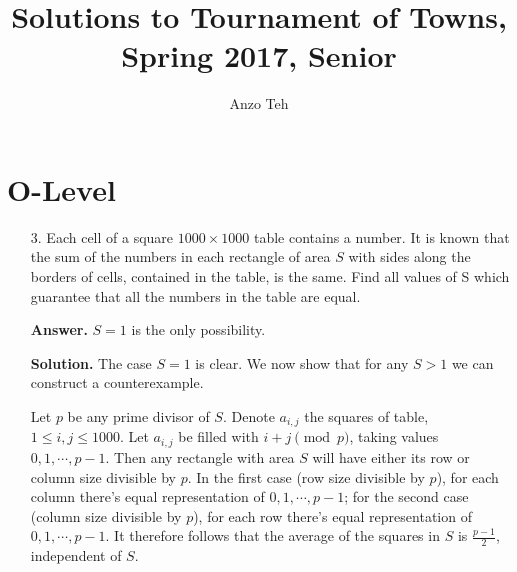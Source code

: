 \documentclass[11pt,a4paper]{article}
\begin{document}
\newcommand{\la}{\leftarrow}
\newcommand{\lra}{\leftrightarrow}
\newcommand{\bbN}{\mathbb{N}}
\newcommand{\bbZ}{\mathbb{Z}}
\newcommand{\dsum}{\displaystyle\sum}
\newcommand{\dprod}{\displaystyle\prod}


\title{Solutions to Tournament of Towns, Spring 2017, Senior}
\author{Anzo Teh}
\date{}
\maketitle

\section*{O-Level}
\begin{enumerate}
	\item[3.]
	Each cell of a square $1000 \times 1000$ table contains a number. It is known
	that the sum of the numbers in each rectangle of area $S$ with sides along
	the borders of cells, contained in the table, is the same. Find all values
	of S which guarantee that all the numbers in the table are equal. 
	
	\textbf{Answer.} $S=1$ is the only possibility. 
	
	\textbf{Solution.} The case $S=1$ is clear. We now show that for any $S>1$ we can construct a counterexample. 
	
	Let $p$ be any prime divisor of $S$. Denote $a_{i, j}$ the squares of table, $1\le i, j\le 1000$. 
	Let $a_{i, j}$ be filled with $i+j\pmod{p}$, taking values $0, 1, \cdots, p-1$. 
	Then any rectangle with area $S$ will have either its row or column size divisible by $p$. 
	In the first case (row size divisible by $p$), for each column there's equal representation of $0, 1, \cdots, p-1$; 
	for the second case (column size divisible by $p$), 
	for each row there's equal representation of $0, 1, \cdots, p-1$. 
	It therefore follows that the average of the squares in $S$ is $\frac{p-1}{2}$, independent of $S$. 
\end{enumerate}
\end{document}
